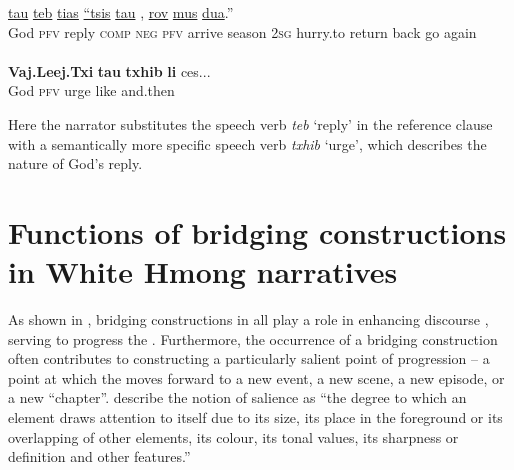 \documentclass[output=paper]{LSP/langsci}
\begin{document}
\begin{exe}
\ex \label{Jaex:14ab}
\begin{xlist}
\ex \label{Jaex:14a}
\gll  \underline{} \underline{tau} \underline{teb} \underline{tias} \underline{``tsis} \underline{tau}     \underline{} \underline{}, \underline{} \underline{} \underline{rov} \underline{} \underline{mus} \underline{dua}.'' \\
  God \textsc{pfv} reply \textsc{comp} \textsc{neg} \textsc{pfv} arrive season \textsc{2sg} hurry.to return back go again\\
\glt {}\\
\ex \label{Jaex:14b}
\gll \textbf{Vaj.Leej.Txi} \textbf{tau}  \textbf{txhib} \textbf{li} ces... \\     	      
     God \textsc{pfv} urge like and.then\\
\glt {} \citep[][17]{vang90}
\end{xlist}
\end{exe}

\noindent
Here the narrator substitutes the speech verb \textit{teb} `reply' in the reference clause with a semantically more specific speech verb \textit{txhib} `urge', which describes the nature of God’s reply. 


\section{Functions of bridging constructions in White Hmong narratives} 
\label{JaFunctions}
As shown in , bridging constructions in  all play a role in enhancing discourse , serving to progress the . Furthermore, the occurrence of a bridging construction often contributes to constructing a particularly salient point of progression – a point at which the  moves forward to a new event, a new scene, a new episode, or a new ``chapter''. \citet[][210]{kress06} describe the notion of salience as ``the degree to which an element draws attention to itself due to its size, its place in the foreground or its overlapping of other elements, its colour, its tonal values, its sharpness or definition and other features.'' 
\end{document}
